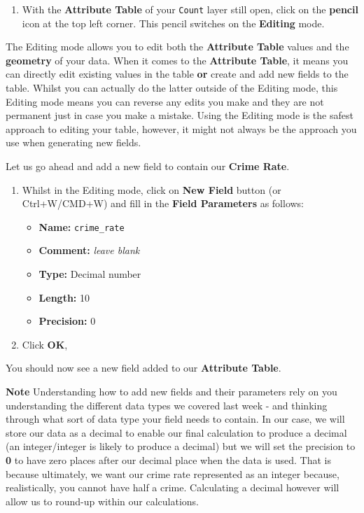 \documentclass[
]{book}
\providecommand{\tightlist}{%
  \setlength{\itemsep}{0pt}\setlength{\parskip}{0pt}}
\begin{document}
\begin{enumerate}
\def\labelenumi{\arabic{enumi}.}
\setcounter{enumi}{5}
\tightlist
\item
  With the \textbf{Attribute Table} of your \texttt{Count} layer still open, click on the \textbf{pencil} icon at the top left corner. This pencil switches on the \textbf{Editing} mode.
\end{enumerate}

The Editing mode allows you to edit both the \textbf{Attribute Table} values and the \textbf{geometry} of your data. When it comes to the \textbf{Attribute Table}, it means you can directly edit existing values in the table \textbf{or} create and add new fields to the table. Whilst you can actually do the latter outside of the Editing mode, this Editing mode means you can reverse any edits you make and they are not permanent just in case you make a mistake.
Using the Editing mode is the safest approach to editing your table, however, it might not always be the approach you use when generating new fields.

Let us go ahead and add a new field to contain our \textbf{Crime Rate}.

\begin{enumerate}
\def\labelenumi{\arabic{enumi}.}
\setcounter{enumi}{6}
\tightlist
\item
  Whilst in the Editing mode, click on \textbf{New Field} button (or Ctrl+W/CMD+W) and fill in the \textbf{Field Parameters} as follows:

  \begin{itemize}
  \tightlist
  \item
    \textbf{Name:} \texttt{crime\_rate}
  \item
    \textbf{Comment:} \emph{leave blank}
  \item
    \textbf{Type:} Decimal number
  \item
    \textbf{Length:} 10
  \item
    \textbf{Precision:} 0
  \end{itemize}
\item
  Click \textbf{OK},
\end{enumerate}

You should now see a new field added to our \textbf{Attribute Table}.

\textbf{Note}
Understanding how to add new fields and their parameters rely on you understanding the different data types we covered last week - and thinking through what sort of data type your field needs to contain. In our case, we will store our data as a decimal to enable our final calculation to produce a decimal (an integer/integer is likely to produce a decimal) but we will set the precision to \textbf{0} to have zero places after our decimal place when the data is used. That is because ultimately, we want our crime rate represented as an integer because, realistically, you cannot have half a crime. Calculating a decimal however will allow us to round-up within our calculations.
\end{document}
